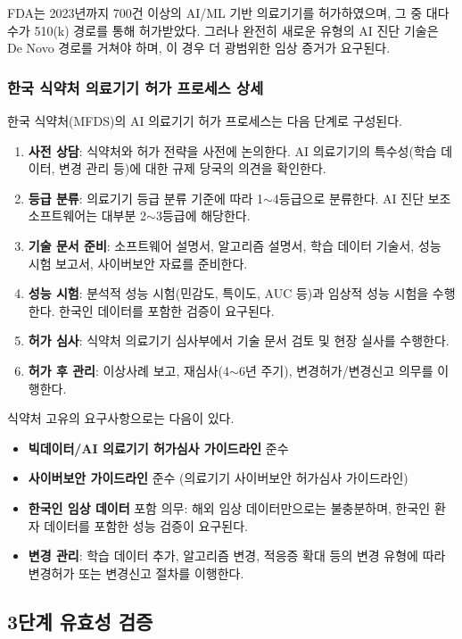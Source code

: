FDA는 2023년까지 700건 이상의 AI/ML 기반 의료기기를 허가하였으며, 그 중 대다수가 510(k) 경로를 통해 허가받았다. 그러나 완전히 새로운 유형의 AI 진단 기술은 De Novo 경로를 거쳐야 하며, 이 경우 더 광범위한 임상 증거가 요구된다.

\subsubsection{한국 식약처 의료기기 허가 프로세스 상세}

한국 식약처(MFDS)의 AI 의료기기 허가 프로세스는 다음 단계로 구성된다.

\begin{enumerate}
 \item \textbf{사전 상담}: 식약처와 허가 전략을 사전에 논의한다. AI 의료기기의 특수성(학습 데이터, 변경 관리 등)에 대한 규제 당국의 의견을 확인한다.
 \item \textbf{등급 분류}: 의료기기 등급 분류 기준에 따라 1$\sim$4등급으로 분류한다. AI 진단 보조 소프트웨어는 대부분 2$\sim$3등급에 해당한다.
 \item \textbf{기술 문서 준비}: 소프트웨어 설명서, 알고리즘 설명서, 학습 데이터 기술서, 성능 시험 보고서, 사이버보안 자료를 준비한다.
 \item \textbf{성능 시험}: 분석적 성능 시험(민감도, 특이도, AUC 등)과 임상적 성능 시험을 수행한다. 한국인 데이터를 포함한 검증이 요구된다.
 \item \textbf{허가 심사}: 식약처 의료기기 심사부에서 기술 문서 검토 및 현장 실사를 수행한다.
 \item \textbf{허가 후 관리}: 이상사례 보고, 재심사(4$\sim$6년 주기), 변경허가/변경신고 의무를 이행한다.
\end{enumerate}

식약처 고유의 요구사항으로는 다음이 있다.
\begin{itemize}
 \item \textbf{빅데이터/AI 의료기기 허가심사 가이드라인} 준수
 \item \textbf{사이버보안 가이드라인} 준수 (의료기기 사이버보안 허가심사 가이드라인)
 \item \textbf{한국인 임상 데이터} 포함 의무: 해외 임상 데이터만으로는 불충분하며, 한국인 환자 데이터를 포함한 성능 검증이 요구된다.
 \item \textbf{변경 관리}: 학습 데이터 추가, 알고리즘 변경, 적응증 확대 등의 변경 유형에 따라 변경허가 또는 변경신고 절차를 이행한다.
\end{itemize}

\subsection{3단계 유효성 검증}
\label{sec:16.1.3}

